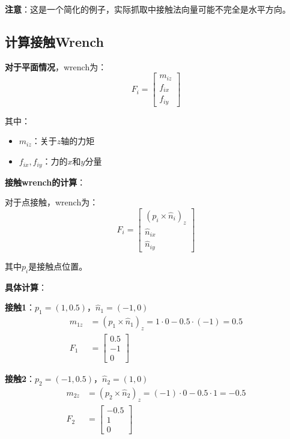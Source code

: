 \documentclass[12pt,a4paper]{article}
\begin{document}
\textbf{注意}：这是一个简化的例子，实际抓取中接触法向量可能不完全是水平方向。

\subsection{计算接触Wrench}

\textbf{对于平面情况}，wrench为：
\begin{equation}
F_i = \begin{bmatrix} m_{iz} \\ f_{ix} \\ f_{iy} \end{bmatrix}
\end{equation}

其中：
\begin{itemize}
\item $m_{iz}$：关于$z$轴的力矩
\item $f_{ix}, f_{iy}$：力的$x$和$y$分量
\end{itemize}

\textbf{接触wrench的计算}：

对于点接触，wrench为：
\begin{equation}
F_i = \begin{bmatrix} 
(p_i \times \hat{n}_i)_z \\
\hat{n}_{ix} \\
\hat{n}_{iy}
\end{bmatrix}
\end{equation}

其中$p_i$是接触点位置。

\textbf{具体计算}：

\textbf{接触1}：$p_1 = (1, 0.5)$，$\hat{n}_1 = (-1, 0)$
\begin{align}
m_{1z} &= (p_1 \times \hat{n}_1)_z = 1 \cdot 0 - 0.5 \cdot (-1) = 0.5 \\
F_1 &= \begin{bmatrix} 0.5 \\ -1 \\ 0 \end{bmatrix}
\end{align}

\textbf{接触2}：$p_2 = (-1, 0.5)$，$\hat{n}_2 = (1, 0)$
\begin{align}
m_{2z} &= (p_2 \times \hat{n}_2)_z = (-1) \cdot 0 - 0.5 \cdot 1 = -0.5 \\
F_2 &= \begin{bmatrix} -0.5 \\ 1 \\ 0 \end{bmatrix}
\end{align}
\end{document}
